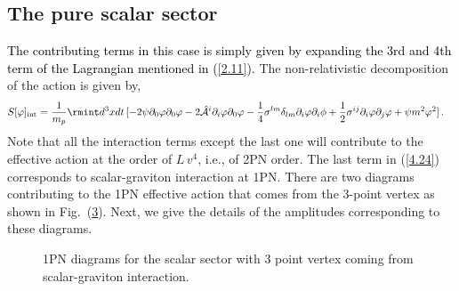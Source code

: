 \subsection{The pure scalar sector}\label{Sec4.3}
\textcolor{black}{The contributing terms in this case is simply given by expanding the 3rd and 4th term of the Lagrangian mentioned in (\ref{2.11}).}
The non-relativistic decomposition of the action is given by,
\begin{align}
    \begin{split}
         S[{\varphi}]_{\text{int}}&
        =\frac{1}{m_p}\rmint d^3x dt \,[-2\psi \partial_{0}\varphi\partial_{0}\varphi-2\Hat{\mathcal{A}}^{i}\partial_{i}\varphi\partial_{0}\varphi-\frac{1}{4}\sigma^{lm}\delta_{lm}\partial_{i}\varphi\partial_{i}\phi+\frac{1}{2}\sigma^{ij}\partial_{i}\varphi\partial_{j}\varphi+\psi m^2 \varphi^2]\,.\label{4.24}
    \end{split}
\end{align}
Note that all the interaction terms except the last one will contribute to the effective action at the order of $L\,v^4$, i.e., of 2PN order. The last term in (\ref{4.24}) corresponds to scalar-graviton interaction at 1PN. There are two diagrams contributing to the 1PN effective action that comes from the 3-point vertex as shown in Fig.~(\ref{ch1:fig:scalar-graviton-1pn}). Next, we give the details of the amplitudes corresponding to these diagrams.
\begin{figure}[t!]
    \centering
    \begin{subfigure}[t]{0.22\textwidth}
        \caption{}
        \label{fig5aa}
    \end{subfigure}
    \begin{subfigure}[t]{0.22\textwidth}
        \centering
{}
        \caption{}
        \label{fig5bb}
    \end{subfigure}
    \caption{1PN diagrams for the scalar sector with 3 point vertex coming from scalar-graviton interaction.}
    \label{ch1:fig:scalar-graviton-1pn}
\end{figure}
